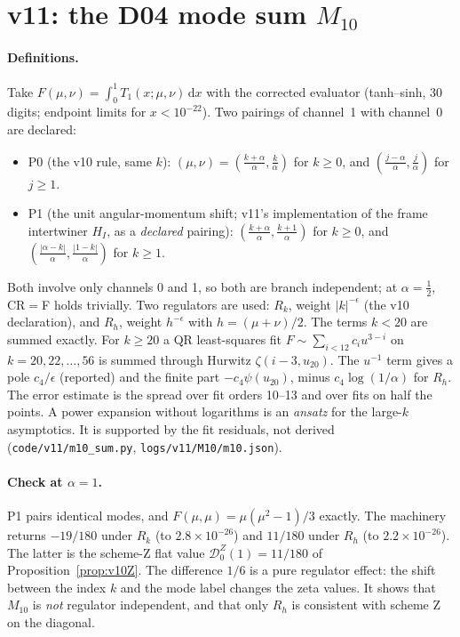 \documentclass[11pt,a4paper]{article}
\newcommand{\loc}[1]{\nolinkurl{#1}}
\newcommand{\Dcal}{\mathcal D}
\theoremstyle{plain}
\theoremstyle{definition}
\theoremstyle{remark}
\numberwithin{equation}{section}
\begin{document}
\section{v11: the D04 mode sum \texorpdfstring{\(M_{10}\)}{M10}}
\label{sec:v11M10}

\paragraph{Definitions.} Take \(F(\mu,\nu)=\int_0^1T_1(x;\mu,\nu)\,\mathrm dx\)
with the corrected evaluator (tanh--sinh, 30 digits; endpoint limits
for \(x<10^{-22}\)). Two pairings of channel~1 with channel~0 are
declared:
\begin{itemize}
\item P0 (the v10 rule, same \(k\)):
\((\mu,\nu)=(\tfrac{k+\alpha}\alpha,\tfrac k\alpha)\) for
\(k\ge0\), and \((\tfrac{j-\alpha}\alpha,\tfrac j\alpha)\) for
\(j\ge1\).
\item P1 (the unit angular-momentum shift; v11's implementation of
the frame intertwiner \(H_I\), as a \emph{declared} pairing):
\((\tfrac{k+\alpha}\alpha,\tfrac{k+1}\alpha)\) for \(k\ge0\), and
\((\tfrac{|\alpha-k|}\alpha,\tfrac{|1-k|}\alpha)\) for \(k\ge1\).
\end{itemize}
Both involve only channels 0 and 1, so both are branch independent;
at \(\alpha=\tfrac12\), CR\(=\)F holds trivially. Two regulators are
used: \(R_k\), weight \(|k|^{-\epsilon}\) (the v10 declaration),
and \(R_h\), weight \(h^{-\epsilon}\) with \(h=(\mu+\nu)/2\). The
terms \(k<20\) are summed exactly. For \(k\ge20\) a QR least-squares
fit \(F\sim\sum_{i<12}c_iu^{3-i}\) on \(k=20,22,\dots,56\) is summed
through Hurwitz \(\zeta(i-3,u_{20})\). The \(u^{-1}\) term gives a
pole \(c_4/\epsilon\) (reported) and the finite part
\(-c_4\psi(u_{20})\), minus \(c_4\log(1/\alpha)\) for \(R_h\). The
error estimate is the spread over fit orders 10--13 and over fits on
half the points. A power expansion without logarithms is an
\emph{ansatz} for the large-\(k\) asymptotics. It is supported by the
fit residuals, not derived (\loc{code/v11/m10_sum.py},
\loc{logs/v11/M10/m10.json}).

\paragraph{Check at \(\alpha=1\).} P1 pairs identical modes, and
\(F(\mu,\mu)=\mu(\mu^2-1)/3\) exactly. The machinery returns
\(-19/180\) under \(R_k\) (to \(2.8\times10^{-26}\)) and \(11/180\) under \(R_h\)
(to \(2.2\times10^{-26}\)). The latter is the scheme-Z flat value
\(\Dcal^Z_0(1)=11/180\) of Proposition~\ref{prop:v10Z}. The difference
\(1/6\) is a pure regulator effect: the shift between the index
\(k\) and the mode label changes the zeta values. It shows that
\(M_{10}\) is \emph{not} regulator independent, and that only \(R_h\)
is consistent with scheme Z on the diagonal.
\end{document}
